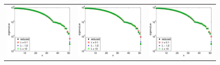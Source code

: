 \documentclass{iopart}
\begin{document}
\begin{figure}
\centering
\begin{tabular}{ccc}
\includegraphics[scale=.2]{./figs/example3_a}&
\includegraphics[scale=.2]{./figs/example3_b}&
\includegraphics[scale=.2]{./figs/example3_c}\\

\end{tabular}
\end{figure}
\end{document}
